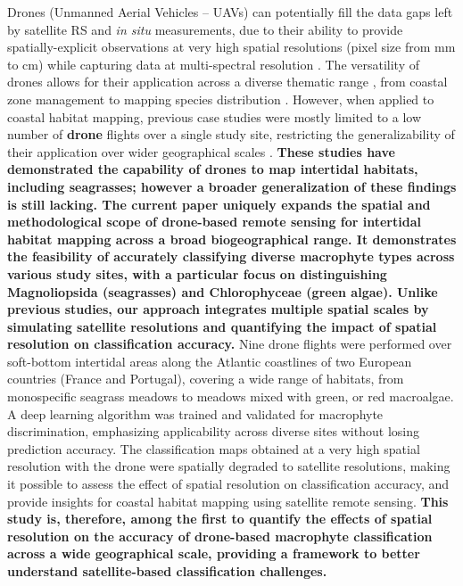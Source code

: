 \documentclass[
  number]{elsarticle}
\begin{document}
Drones (Unmanned Aerial Vehicles -- UAVs) can potentially fill the data
gaps left by satellite RS and \emph{in situ} measurements, due to their
ability to provide spatially-explicit observations at very high spatial
resolutions (pixel size from mm to cm) while capturing data at
multi-spectral resolution \citep{fairley2022drone, oh2017use}. The
versatility of drones allows for their application across a diverse
thematic range , from coastal zone management
\citep{adade2021, casella2020, angnuureng2022} to mapping species
distribution
\citep{joyce2023, tallam2023, Roca2022, Roman2021, Brunier2022Topographic, sousa2019blue}.
However, when applied to coastal habitat mapping, previous case studies
were mostly limited to a low number of \textbf{drone} flights over a
single study site, restricting the generalizability of their application
over wider geographical scales
\citep{Roman2021, collin2019improving, rossiter2020uav, Brunier2022Topographic}.
\textbf{These studies have demonstrated the capability of drones to map
intertidal habitats, including seagrasses; however a broader
generalization of these findings is still lacking. The current paper
uniquely expands the spatial and methodological scope of drone-based
remote sensing for intertidal habitat mapping across a broad
biogeographical range. It demonstrates the feasibility of accurately
classifying diverse macrophyte types across various study sites, with a
particular focus on distinguishing Magnoliopsida (seagrasses) and
Chlorophyceae (green algae). Unlike previous studies, our approach
integrates multiple spatial scales by simulating satellite resolutions
and quantifying the impact of spatial resolution on classification
accuracy.} Nine drone flights were performed over soft-bottom intertidal
areas along the Atlantic coastlines of two European countries (France
and Portugal), covering a wide range of habitats, from monospecific
seagrass meadows to meadows mixed with green, or red macroalgae. A deep
learning algorithm was trained and validated for macrophyte
discrimination, emphasizing applicability across diverse sites without
losing prediction accuracy. The classification maps obtained at a very
high spatial resolution with the drone were spatially degraded to
satellite resolutions, making it possible to assess the effect of
spatial resolution on classification accuracy, and provide insights for
coastal habitat mapping using satellite remote sensing. \textbf{This
study is, therefore, among the first to quantify the effects of spatial
resolution on the accuracy of drone-based macrophyte classification
across a wide geographical scale, providing a framework to better
understand satellite-based classification challenges.}
\end{document}
